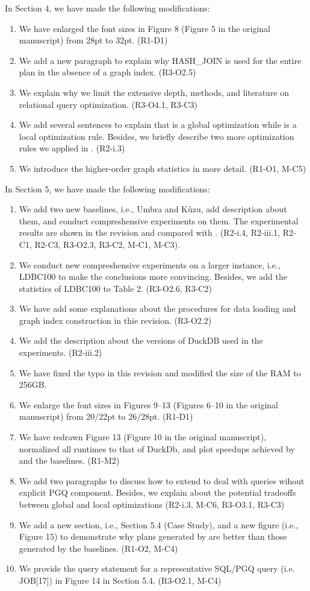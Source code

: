 \documentclass{article}
\begin{document}
In Section 4, we have made the following modifications:
\begin{enumerate}
	\item We have enlarged the font sizes in Figure 8 (Figure 5 in the original manuscript) from 28pt to 32pt. (R1-D1)
	\item We add a new paragraph to explain why HASH\_JOIN is used for the entire plan in the absence of a graph index. (R3-O2.5)
	\item We explain why we limit the extensive depth, methods, and literature on relational query optimization. (R3-O4.1, R3-C3)
	\item We add several sentences to explain that \filterrule is a global optimization while \fusionrule is a local optimization rule. Besides, we briefly describe two more optimization rules we applied in \name. (R2-i.3)
	\item We introduce the higher-order graph statistics in more detail. (R1-O1, M-C5)
\end{enumerate}

In Section 5, we have made the following modifications:
\begin{enumerate}
	\item We add two new baselines, i.e., Umbra and Kùzu, add description about them, and conduct compreshensive experiments on them. The experimental results are shown in the revision and compared with \name. (R2-i.4, R2-iii.1, R2-C1, R2-C3, R3-O2.3, R3-C2, M-C1, M-C3).
	\item We conduct new compreshensive experiments on a larger instance, i.e., LDBC100 to make the conclusions more convincing. Besides, we add the statistics of LDBC100 to Table 2. (R3-O2.6, R3-C2)
	\item We have add some explanations about the procedures for data loading and graph index construction in thie revision. (R3-O2.2)
	\item We add the description about the versions of DuckDB used in the experiments. (R2-iii.2)
	\item We have fixed the typo in this revision and modified the size of the RAM to 256GB.
	\item We enlarge the font sizes in Figures 9--13 (Figures 6--10 in the original manuscript) from 20/22pt to 26/28pt. (R1-D1)
	\item We have redrawn Figure 13 (Figure 10 in the original manuscript), normalized all runtimes to that of DuckDb, and plot speedups achieved by \name and the baselines. (R1-M2)
	\item We add two paragraphs to discuss how to extend \name to deal with queries wihout explicit PGQ component. Besides, we explain about the potential tradeoffs between global and local optimizations (R2-i.3, M-C6, R3-O3.1, R3-C3)
	\item We add a new section, i.e., Section 5.4 (Case Study), and a new figure (i.e., Figure 15) to demonstrate why plans generated by \name are better than those generated by the baselines. (R1-O2, M-C4)
	\item We provide the query statement for a representative SQL/PGQ query (i.e. JOB[17]) in Figure 14 in Section 5.4. (R3-O2.1, M-C4)
\end{enumerate}
\end{document}
